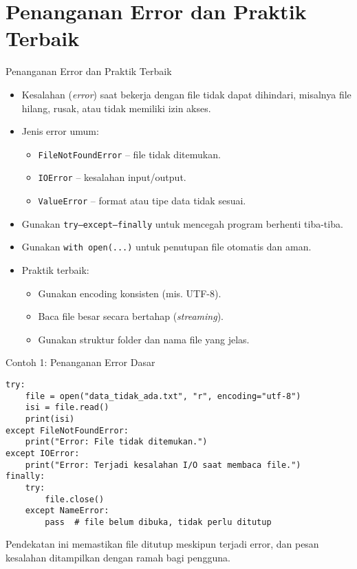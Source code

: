 \documentclass[aspectratio=169, table]{beamer}
\begin{document}
\section{Penanganan Error dan Praktik Terbaik}

\begin{frame}{Penanganan Error dan Praktik Terbaik}
\vspace{20pt}
\begin{itemize}
  \item Kesalahan (\textit{error}) saat bekerja dengan file tidak dapat dihindari, misalnya file hilang, rusak, atau tidak memiliki izin akses.
  \item Jenis error umum: 
  \begin{itemize}
    \item \texttt{FileNotFoundError} – file tidak ditemukan.  
    \item \texttt{IOError} – kesalahan input/output.  
    \item \texttt{ValueError} – format atau tipe data tidak sesuai.
  \end{itemize}
  \item Gunakan \texttt{try--except--finally} untuk mencegah program berhenti tiba-tiba.
  \item Gunakan \texttt{with open(...)} untuk penutupan file otomatis dan aman.
  \item Praktik terbaik:
  \begin{itemize}
    \item Gunakan encoding konsisten (mis. UTF-8).  
    \item Baca file besar secara bertahap (\textit{streaming}).  
    \item Gunakan struktur folder dan nama file yang jelas.
  \end{itemize}
\end{itemize}
\end{frame}

\begin{frame}[fragile]{Contoh 1: Penanganan Error Dasar}
\vspace{20pt}
\begin{lstlisting}[style=PythonStyle]
try:
    file = open("data_tidak_ada.txt", "r", encoding="utf-8")
    isi = file.read()
    print(isi)
except FileNotFoundError:
    print("Error: File tidak ditemukan.")
except IOError:
    print("Error: Terjadi kesalahan I/O saat membaca file.")
finally:
    try:
        file.close()
    except NameError:
        pass  # file belum dibuka, tidak perlu ditutup
\end{lstlisting}

\noindent
Pendekatan ini memastikan file ditutup meskipun terjadi error, 
dan pesan kesalahan ditampilkan dengan ramah bagi pengguna.
\end{frame}
\end{document}

